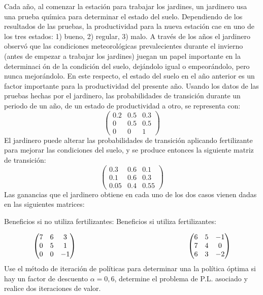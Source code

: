 \documentclass[twoside]{article}
\begin{document}
\newpage 
\begin{ejercicio}{2}
Cada año, al comenzar la estación para trabajar los jardines, un jardinero usa una prueba
química para determinar el estado del suelo. Dependiendo de los resultados de las pruebas, la
productividad para la nueva estación cae en uno de los tres estados: 1) bueno, 2) regular, 3) malo.
A través de los años el jardinero observó que las condiciones meteorológicas prevalecientes durante
el invierno (antes de empezar a trabajar los jardines) juegan un papel importante en la determinaci
ón de la condición del suelo, dejándolo igual o empeorándolo, pero nunca mejorándolo. En
este respecto, el estado del suelo en el año anterior es un factor importante para la productividad
del presente año. Usando los datos de las pruebas hechas por el jardinero, las probabilidades de
transición durante un periodo de un año, de un estado de productividad a otro, se representa con:
\[
\begin{pmatrix}
0. 2 & 0. 5 & 0. 3\\
0 & 0.5 & 0.5\\
0 & 0 & 1
\end{pmatrix}
\]
El jardinero puede alterar las probabilidades de transición aplicando fertilizante para mejorar las
condiciones del suelo, y se produce entonces la siguiente matriz de transición:
\[
\begin{pmatrix}
0.3 & 0.6 & 0.1\\
0.1 & 0.6 & 0.3\\
0.05 & 0.4 & 0.55
\end{pmatrix}
\]
Las ganancias que el jardinero obtiene en cada uno de los dos casos vienen dadas en las siguientes
matrices:

Beneficios si no utiliza fertilizantes: \hskip3cm Beneficios si utiliza fertilizantes:

\[
\begin{pmatrix}
7 & 6 & 3\\
0 & 5 & 1\\
0 & 0 & -1
\end{pmatrix}\hskip5.5cm
\begin{pmatrix}
6 & 5 & -1\\
7 & 4 & 0\\
6 & 3 & -2
\end{pmatrix}
\]
Use el método de iteración de políticas para determinar una la política óptima si hay un factor de
descuento $\alpha = 0,6$, determine el problema de P.L. asociado y realice dos iteraciones de valor.
\begin{solucion}

\end{solucion}

\end{ejercicio}
\end{document}
